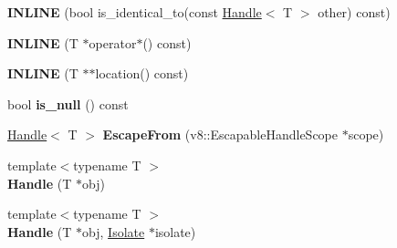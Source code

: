 \begin{DoxyCompactItemize}
\item 
\hypertarget{classv8_1_1internal_1_1_handle_a7cc31780ceedc46b2d5de8218554cedb}{}{\bfseries I\+N\+L\+I\+N\+E} (bool is\+\_\+identical\+\_\+to(const \hyperlink{classv8_1_1internal_1_1_handle}{Handle}$<$ T $>$ other) const)\label{classv8_1_1internal_1_1_handle_a7cc31780ceedc46b2d5de8218554cedb}

\item 
\hypertarget{classv8_1_1internal_1_1_handle_ab9b90539f779b58f54401a1a201e2c39}{}{\bfseries I\+N\+L\+I\+N\+E} (T $\ast$operator$\ast$() const)\label{classv8_1_1internal_1_1_handle_ab9b90539f779b58f54401a1a201e2c39}

\item 
\hypertarget{classv8_1_1internal_1_1_handle_a1f80fb48339c47dcba61f9bb1208274f}{}{\bfseries I\+N\+L\+I\+N\+E} (T $\ast$$\ast$location() const)\label{classv8_1_1internal_1_1_handle_a1f80fb48339c47dcba61f9bb1208274f}

\item 
\hypertarget{classv8_1_1internal_1_1_handle_a43ac43769a369c13c6b477ee1ac86294}{}bool {\bfseries is\+\_\+null} () const \label{classv8_1_1internal_1_1_handle_a43ac43769a369c13c6b477ee1ac86294}

\item 
\hypertarget{classv8_1_1internal_1_1_handle_a53a0af13b302880b5d57d2cbdec12f77}{}\hyperlink{classv8_1_1internal_1_1_handle}{Handle}$<$ T $>$ {\bfseries Escape\+From} (v8\+::\+Escapable\+Handle\+Scope $\ast$scope)\label{classv8_1_1internal_1_1_handle_a53a0af13b302880b5d57d2cbdec12f77}

\item 
\hypertarget{classv8_1_1internal_1_1_handle_a37f54fd3a798d6eec7412f398cee451e}{}{\footnotesize template$<$typename T $>$ }\\{\bfseries Handle} (T $\ast$obj)\label{classv8_1_1internal_1_1_handle_a37f54fd3a798d6eec7412f398cee451e}

\item 
\hypertarget{classv8_1_1internal_1_1_handle_ab6bdd82cf0a3fa44d27771ece3c9bf1f}{}{\footnotesize template$<$typename T $>$ }\\{\bfseries Handle} (T $\ast$obj, \hyperlink{classv8_1_1internal_1_1_isolate}{Isolate} $\ast$isolate)\label{classv8_1_1internal_1_1_handle_ab6bdd82cf0a3fa44d27771ece3c9bf1f}

\end{DoxyCompactItemize}
